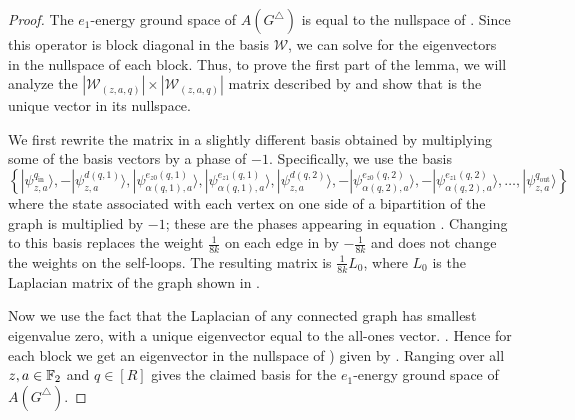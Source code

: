 \documentclass[../thesis-main/thesis-main]{subfiles}
\begin{document}
\begin{proof}
The $e_1$-energy ground space of $A(G^{\triangle})$ is equal to the nullspace of . Since this operator is block diagonal in the basis $\mathcal{W}$, we can solve for the eigenvectors in the nullspace of each block. Thus, to prove the first part of the lemma, we will analyze the $|\mathcal{W}_{(z,a,q)}|\times|\mathcal{W}_{(z,a,q)}|$ matrix described by  and show that  is the unique vector in its nullspace. 

We first rewrite the matrix in a slightly different basis obtained by multiplying some of the basis vectors by a phase of $-1$. Specifically, we use the basis
\begin{equation}
\left\{
   |\psi_{z,a}^{q_{\mathrm{in}}}\rangle,
  -|\psi_{z,a}^{d(q,1)}\rangle,
   |\psi_{\alpha(q,1),a}^{e_{z0}(q,1)}\rangle,
   |\psi_{\alpha(q,1),a}^{e_{z1}(q,1)}\rangle,
   |\psi_{z,a}^{d(q,2)}\rangle,
  -|\psi_{\alpha(q,2),a}^{e_{z0}(q,2)}\rangle,
  -|\psi_{\alpha(q,2),a}^{e_{z1}(q,2)}\rangle,
   \ldots,
   |\psi_{z,a}^{q_{\mathrm{out}}}\rangle
\right\} 
\end{equation}
where the state associated with each vertex on one side of a bipartition of the graph is multiplied by $-1$; these are the phases appearing in equation . Changing to this basis replaces the weight $\frac{1}{8k}$ on each edge in  by $-\frac{1}{8k}$ and does not change the weights on the self-loops. The resulting matrix is $\frac{1}{8k}L_{0}$, where $L_{0}$ is the Laplacian matrix of the graph shown in . 

Now we use the fact that the Laplacian of any connected graph has smallest eigenvalue zero, with a unique eigenvector equal to the all-ones vector.
. Hence for each block we get an eigenvector in the nullspace of ) given by . Ranging over all $z,a\in\mathbb{F}_2$ and $q\in[R]$ gives the claimed basis for the $e_1$-energy ground space of $A(G^{\triangle})$.


\end{proof}
\end{document}
